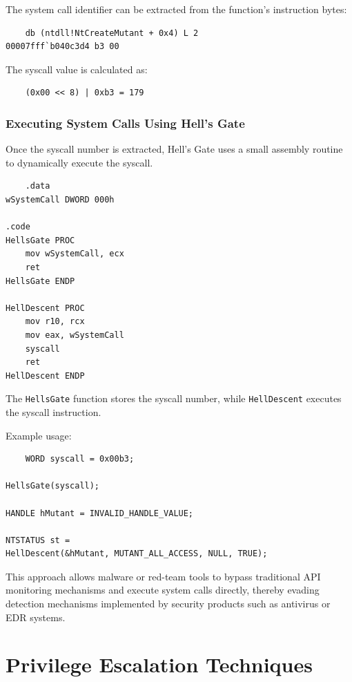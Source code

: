 The system call identifier can be extracted from the function's instruction bytes:

\begin{lstlisting}
    db (ntdll!NtCreateMutant + 0x4) L 2
00007fff`b040c3d4 b3 00
\end{lstlisting}



The syscall value is calculated as:

\begin{lstlisting}
    (0x00 << 8) | 0xb3 = 179
\end{lstlisting}



\subsubsection{Executing System Calls Using Hell's Gate}

Once the syscall number is extracted, Hell's Gate uses a small assembly routine 
to dynamically execute the syscall.

\begin{lstlisting}
    .data
wSystemCall DWORD 000h

.code
HellsGate PROC
    mov wSystemCall, ecx
    ret
HellsGate ENDP

HellDescent PROC
    mov r10, rcx
    mov eax, wSystemCall
    syscall
    ret
HellDescent ENDP
\end{lstlisting}



The \texttt{HellsGate} function stores the syscall number, while \texttt{HellDescent} 
executes the syscall instruction.

Example usage:

\begin{lstlisting}
    WORD syscall = 0x00b3;

HellsGate(syscall);

HANDLE hMutant = INVALID_HANDLE_VALUE;

NTSTATUS st =
HellDescent(&hMutant, MUTANT_ALL_ACCESS, NULL, TRUE);
\end{lstlisting}


This approach allows malware or red-team tools to bypass traditional API monitoring 
mechanisms and execute system calls directly, thereby evading detection mechanisms 
implemented by security products such as antivirus or EDR systems.

\section{Privilege Escalation Techniques}

